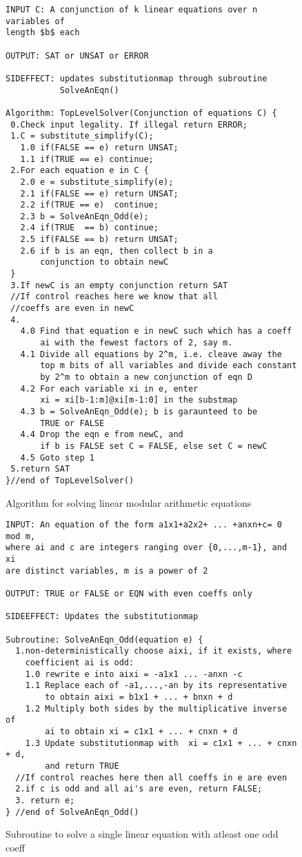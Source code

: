 \begin{figure} [p]
\begin{verbatim}
INPUT C: A conjunction of k linear equations over n variables of
length $b$ each

OUTPUT: SAT or UNSAT or ERROR

SIDEFFECT: updates substitutionmap through subroutine 
           SolveAnEqn()

Algorithm: TopLevelSolver(Conjunction of equations C) {
 0.Check input legality. If illegal return ERROR;
 1.C = substitute_simplify(C);
   1.0 if(FALSE == e) return UNSAT;
   1.1 if(TRUE == e) continue;
 2.For each equation e in C {
   2.0 e = substitute_simplify(e);
   2.1 if(FALSE == e) return UNSAT;
   2.2 if(TRUE == e)  continue;
   2.3 b = SolveAnEqn_Odd(e);
   2.4 if(TRUE  == b) continue;
   2.5 if(FALSE == b) return UNSAT;
   2.6 if b is an eqn, then collect b in a 
       conjunction to obtain newC
 }
 3.If newC is an empty conjunction return SAT
 //If control reaches here we know that all 
 //coeffs are even in newC
 4. 
   4.0 Find that equation e in newC such which has a coeff 
       ai with the fewest factors of 2, say m.
   4.1 Divide all equations by 2^m, i.e. cleave away the 
       top m bits of all variables and divide each constant 
       by 2^m to obtain a new conjunction of eqn D
   4.2 For each variable xi in e, enter 
       xi = xi[b-1:m]@xi[m-1:0] in the substmap
   4.3 b = SolveAnEqn_Odd(e); b is garaunteed to be 
       TRUE or FALSE
   4.4 Drop the eqn e from newC, and 
       if b is FALSE set C = FALSE, else set C = newC
   4.5 Goto step 1
 5.return SAT
}//end of TopLevelSolver()

\end{verbatim}
\caption{\label{fig1} Algorithm for solving linear modular arithmetic
equations}
\end{figure}

\begin{figure} [p]
\begin{verbatim}
INPUT: An equation of the form a1x1+a2x2+ ... +anxn+c= 0 mod m, 
where ai and c are integers ranging over {0,...,m-1}, and xi 
are distinct variables, m is a power of 2

OUTPUT: TRUE or FALSE or EQN with even coeffs only

SIDEEFFECT: Updates the substitutionmap

Subroutine: SolveAnEqn_Odd(equation e) {
  1.non-deterministically choose aixi, if it exists, where 
    coefficient ai is odd:
    1.0 rewrite e into aixi = -a1x1 ... -anxn -c
    1.1 Replace each of -a1,...,-an by its representative 
        to obtain aixi = b1x1 + ... + bnxn + d
    1.2 Multiply both sides by the multiplicative inverse of 
        ai to obtain xi = c1x1 + ... + cnxn + d
    1.3 Update substitutionmap with  xi = c1x1 + ... + cnxn + d, 
        and return TRUE
  //If control reaches here then all coeffs in e are even
  2.if c is odd and all ai's are even, return FALSE;
  3. return e;
} //end of SolveAnEqn_Odd()
\end{verbatim}
\caption{\label{fig2} Subroutine to solve a single linear equation with atleast one odd coeff}
\end{figure}

% 
%




